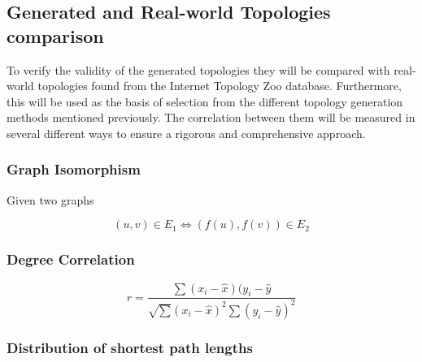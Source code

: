\subsection{Generated and Real-world Topologies comparison}
To verify the validity of the generated topologies they will be compared with real-world topologies found from the Internet Topology Zoo database. Furthermore, this will be used as the basis of selection from the different topology generation methods mentioned previously. The correlation between them will be measured in several different ways to ensure a rigorous and comprehensive approach.

\subsubsection{Graph Isomorphism}
Given two graphs 

\begin{equation}
    (u,v) \in E_1 \Leftrightarrow (f(u),f(v)) \in E_2
\end{equation}

\subsubsection{Degree Correlation}

\begin{equation}
    r = \frac{\sum(x_i - \hat{x})(y_i-\hat{y}}{\sqrt{\sum}(x_i-\hat{x})^2\sum(y_i-\hat{y})^2}
\end{equation}



\subsubsection{Distribution of shortest path lengths}


